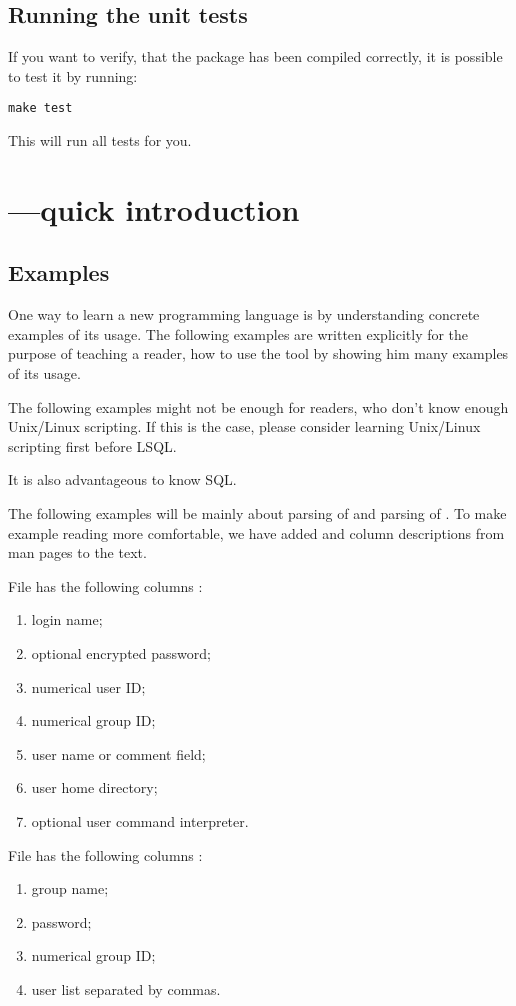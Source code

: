 \subsection{Running the unit tests}
If you want to verify, that the package has been compiled correctly, it is possible to test it by running:
\begin{verbatim}
make test
\end{verbatim}
This will run all tests for you.

\section{---quick introduction}

\subsection{Examples}
One way to learn a new programming language is by understanding concrete examples of its usage. The following examples are written explicitly for the purpose of teaching a reader, how to use the tool  by showing him many examples of its usage.

The following examples might not be enough for readers, who don't know enough Unix/Linux scripting. If this is the case, please consider learning Unix/\allowbreak Linux scripting first before LSQL.

It is also advantageous to know SQL.

The following examples will be mainly about parsing of  and parsing of . To make example reading more comfortable, we have added  and  column descriptions from man pages to the text.

File  has the following columns \cite{passwd}:
\begin{enumerate}
    \item login name;
    \item optional encrypted password;
    \item numerical user ID;
    \item numerical group ID;    
    \item user name or comment field;
    \item user home directory;
    \item optional user command interpreter.
\end{enumerate}
File  has the following columns \cite{group}:
\begin{enumerate}
    \item group name;
    \item password;
    \item numerical group ID;
    \item user list separated by commas.
\end{enumerate}


